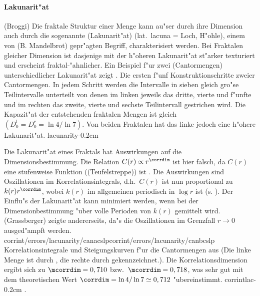 \paragraph{Lakunarit"at}
\korrektur(Broggi)
Die fraktale Struktur einer Menge kann au"ser durch ihre Dimension auch durch die
sogenannte \begriff(Lakunarit"at) (lat.\  lacuna = Loch, H"ohle), einem von
\autor(B. Mandelbrot) \cite{Mandelbrot82} gepr"agten Begriff, charakterisiert werden. 
Bei Fraktalen gleicher Dimension ist dasjenige mit der h"oheren Lakunarit"at st"arker
texturiert und erscheint fraktal-"ahnlicher. Ein Beispiel f"ur zwei \begriff(Cantormengen)
unterschiedlicher Lakunarit"at zeigt .
%
{Die ersten f"unf Konstruktionschritte zweier Cantormengen. In jedem Schritt werden die
Intervalle in sieben gleich gro"se Teilintervalle unterteilt von denen im linken jeweils
das dritte, vierte und f"unfte und im rechten das zweite, vierte und sechste Teilintervall
gestrichen wird. Die Kapazit"at der entstehenden fraktalen Mengen ist 
gleich $(D^l_0=D^r_0=\ln4/\ln 7)$. Von beiden Fraktalen hat das linke jedoch eine h"ohere Lakunarit"at.
}{lacunarity}{-0.2cm}

Die Lakunarit"at eines Fraktals hat Auswirkungen auf die Dimensionsbestimmung. Die
Relation $C(r)\propto r^\corrdim$ ist hier falsch, da $C(r)$ eine stufenweise Funktion
(\begriff(Teufelstreppe)) ist \cite{Broggi88}. 
Die Auswirkungen sind Oszillationen im Korrelationsintegrals, d.h.\  $C(r)$ ist nun proportional zu
$k(r)r^\corrdim$, wobei $k(r)$ im allgemeinen periodisch in $\log r$ ist
(s. ). Der Einflu"s der  Lakunarit"at kann minimiert werden, wenn bei
der Dimensionbestimmung "uber volle Perioden von $k(r)$ gemittelt wird.
\autor(Grassberger) zeigte andererseits, da"s die Oszillationen im Grenzfall $r\to 0$
ausged"ampft werden\cite{Grassberger88}.
%
{corrint/errors/lacunarity/canacslp}{corrint/errors/lacunarity/canbcslp}
{Korrelationsintegrale und Steigungskurven f"ur die Cantormengen aus 
(Die linke Menge ist durch \gpmarkb, die rechte durch \gpmarkd{} gekennzeichnet.). Die
Korrelationsdimension ergibt sich zu $\mcorrdim=0,710$ bzw.\  $\mcorrdim=0,718$, was sehr gut mit dem
theoretischen Wert $\corrdim=\ln 4 /\ln 7\simeq 0,712$ "ubereinstimmt\footnotemark.
}{corrintlac}{-0.2cm}
.



